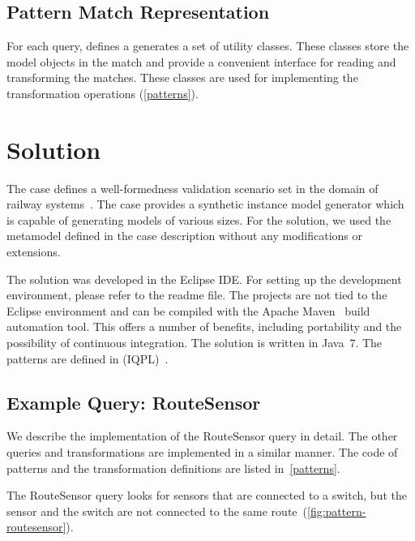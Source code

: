 \documentclass[submission,copyright,creativecommons]{eptcs}
\begin{document}
\subsection{Pattern Match Representation}

For each query, \eiq defines a generates a set of utility classes. These classes store the model objects in the match and provide a convenient interface for reading and transforming the matches. These classes are used for implementing the transformation operations (\autoref{patterns}).

\section{Solution}

The case defines a well-formedness validation scenario set in the domain of railway systems~\cite{ttc-trainbenchmark-case}. The case provides a synthetic instance model generator which is capable of generating models of various sizes. For the solution, we used the metamodel defined in the case description without any modifications or extensions.


The solution was developed in the Eclipse IDE. For setting up the development environment, please refer to the readme file. The projects are not tied to the Eclipse environment and can be compiled with the Apache Maven~\cite{Maven} build automation tool. This offers a number of benefits, including portability and the possibility of continuous integration. The solution is written in Java~7. The patterns are defined in \iqpl (IQPL)~\cite{iqpl}.

\subsection{Example Query: \textsf{RouteSensor}}

We describe the implementation of the \textsf{RouteSensor} query in detail. The other queries and transformations are implemented in a similar manner. The code of patterns and the transformation definitions are listed in~\autoref{patterns}.

The \textsf{RouteSensor} query looks for sensors that are connected to a switch, but the sensor and the switch are not connected to the same route~(\autoref{fig:pattern-routesensor}).

\end{document}
